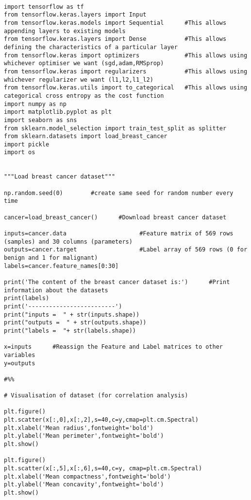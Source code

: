 \begin{verbatim}

import tensorflow as tf
from tensorflow.keras.layers import Input
from tensorflow.keras.models import Sequential      #This allows appending layers to existing models
from tensorflow.keras.layers import Dense           #This allows defining the characteristics of a particular layer
from tensorflow.keras import optimizers             #This allows using whichever optimiser we want (sgd,adam,RMSprop)
from tensorflow.keras import regularizers           #This allows using whichever regularizer we want (l1,l2,l1_l2)
from tensorflow.keras.utils import to_categorical   #This allows using categorical cross entropy as the cost function
import numpy as np
import matplotlib.pyplot as plt
import seaborn as sns
from sklearn.model_selection import train_test_split as splitter
from sklearn.datasets import load_breast_cancer
import pickle
import os 


"""Load breast cancer dataset"""

np.random.seed(0)        #create same seed for random number every time

cancer=load_breast_cancer()      #Download breast cancer dataset

inputs=cancer.data                     #Feature matrix of 569 rows (samples) and 30 columns (parameters)
outputs=cancer.target                  #Label array of 569 rows (0 for benign and 1 for malignant)
labels=cancer.feature_names[0:30]

print('The content of the breast cancer dataset is:')      #Print information about the datasets
print(labels)
print('-------------------------')
print("inputs =  " + str(inputs.shape))
print("outputs =  " + str(outputs.shape))
print("labels =  "+ str(labels.shape))

x=inputs      #Reassign the Feature and Label matrices to other variables
y=outputs

#%% 

# Visualisation of dataset (for correlation analysis)

plt.figure()
plt.scatter(x[:,0],x[:,2],s=40,c=y,cmap=plt.cm.Spectral)
plt.xlabel('Mean radius',fontweight='bold')
plt.ylabel('Mean perimeter',fontweight='bold')
plt.show()

plt.figure()
plt.scatter(x[:,5],x[:,6],s=40,c=y, cmap=plt.cm.Spectral)
plt.xlabel('Mean compactness',fontweight='bold')
plt.ylabel('Mean concavity',fontweight='bold')
plt.show()



\end{verbatim}
